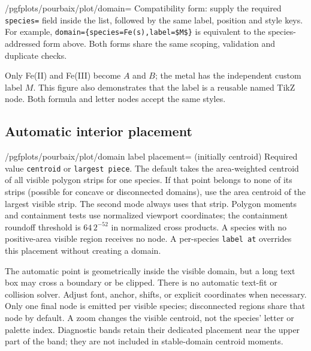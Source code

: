 \documentclass[a4paper,11pt]{ltxdoc}
\begin{document}
\begin{key}{/pgfplots/pourbaix/plot/domain=}
Compatibility form: supply the required \texttt{species=} field
inside the list, followed by the same label, position and style keys. For example,
\texttt{domain=\{species=Fe(s),label=\$M\$\}} is equivalent to the species-addressed
form above. Both forms share the same scoping, validation and duplicate checks.
\end{key}

\begin{codeexample}[width=8cm]
\end{codeexample}
Only Fe(II) and Fe(III) become $A$ and $B$; the metal has the independent custom
label $M$. This figure also demonstrates that the label is a reusable named TikZ
node. Both formula and letter nodes accept the same styles.

\subsection{Automatic interior placement}
\begin{key}{/pgfplots/pourbaix/plot/domain label placement= (initially centroid)}
Required value \texttt{centroid} or \texttt{largest piece}. The default takes the
area-weighted centroid of all visible polygon strips for one species. If that
point belongs to none of its strips (possible for concave or disconnected domains),
use the area centroid of the largest visible strip. The second mode always uses
that strip. Polygon moments and containment tests use normalized viewport
coordinates; the containment roundoff threshold is $64\,2^{-52}$ in normalized
cross products. A species with no positive-area visible region receives no node.
A per-species \texttt{label at} overrides this placement without creating a domain.
\end{key}
The automatic point is geometrically inside the visible domain, but a long text
box may cross a boundary or be clipped. There is no automatic text-fit or collision
solver. Adjust font, anchor, shifts, or explicit coordinates when necessary.
Only one final node is emitted per visible species; disconnected regions share
that node by default. A zoom changes the visible centroid, not the species' letter
or palette index. Diagnostic bands retain their dedicated placement near the
upper part of the band; they are not included in stable-domain centroid moments.
\end{document}
